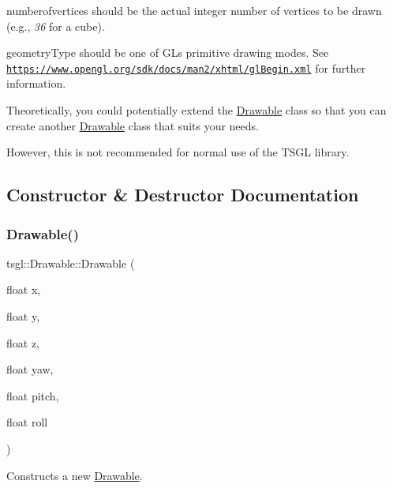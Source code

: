 {\ttfamily numberofvertices} should be the actual integer number of vertices to be drawn (e.\+g., {\itshape 36} for a cube).

{\ttfamily geometry\+Type} should be one of GL\textquotesingle{}s primitive drawing modes. See \href{https://www.opengl.org/sdk/docs/man2/xhtml/glBegin.xml}{\tt https\+://www.\+opengl.\+org/sdk/docs/man2/xhtml/gl\+Begin.\+xml} for further information.

Theoretically, you could potentially extend the \hyperlink{classtsgl_1_1_drawable}{Drawable} class so that you can create another \hyperlink{classtsgl_1_1_drawable}{Drawable} class that suits your needs.

However, this is not recommended for normal use of the T\+S\+GL library. 

\subsection{Constructor \& Destructor Documentation}
\mbox{\label{classtsgl_1_1_drawable_a3a1394a83d01e3036b9eaf67dd5f56e6}} 
\subsubsection{\texorpdfstring{Drawable()}{Drawable()}}
{\footnotesize\ttfamily tsgl\+::\+Drawable\+::\+Drawable (\begin{DoxyParamCaption}\item[{float}]{x,  }\item[{float}]{y,  }\item[{float}]{z,  }\item[{float}]{yaw,  }\item[{float}]{pitch,  }\item[{float}]{roll }\end{DoxyParamCaption})}



Constructs a new \hyperlink{classtsgl_1_1_drawable}{Drawable}. 


